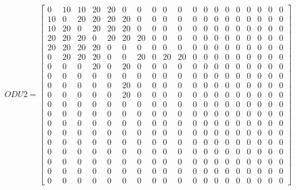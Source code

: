 \[
ODU2=
  \begin{bmatrix}
    0 & 10 & 10 & 20 & 20 & 0 & 0 & 0 & 0 & 0 & 0 & 0 & 0 & 0 & 0 & 0 & 0 & 0 & 0 \\
    10 & 0 & 20 & 20 & 20 & 20 & 0 & 0 & 0 & 0 & 0 & 0 & 0 & 0 & 0 & 0 & 0 & 0 & 0 \\
    10 & 20 & 0 & 20 & 20 & 20 & 0 & 0 & 0 & 0 & 0 & 0 & 0 & 0 & 0 & 0 & 0 & 0 & 0 \\
    20 & 20 & 20 & 0 & 20 & 20 & 20 & 0 & 0 & 0 & 0 & 0 & 0 & 0 & 0 & 0 & 0 & 0 & 0 \\
    20 & 20 & 20 & 20 & 0 & 0 & 0 & 0 & 0 & 0 & 0 & 0 & 0 & 0 & 0 & 0 & 0 & 0 & 0 \\
    0 & 20 & 20 & 20 & 0 & 0 & 20 & 0 & 20 & 20 & 0 & 0 & 0 & 0 & 0 & 0 & 0 & 0 & 0 \\
    0 & 0 & 0 & 20 & 0 & 20 & 0 & 0 & 0 & 0 & 0 & 0 & 0 & 0 & 0 & 0 & 0 & 0 & 0 \\
    0 & 0 & 0 & 0 & 0 & 0 & 0 & 0 & 0 & 0 & 0 & 0 & 0 & 0 & 0 & 0 & 0 & 0 & 0 \\
    0 & 0 & 0 & 0 & 0 & 20 & 0 & 0 & 0 & 0 & 0 & 0 & 0 & 0 & 0 & 0 & 0 & 0 & 0 \\
    0 & 0 & 0 & 0 & 0 & 20 & 0 & 0 & 0 & 0 & 0 & 0 & 0 & 0 & 0 & 0 & 0 & 0 & 0 \\
    0 & 0 & 0 & 0 & 0 & 0 & 0 & 0 & 0 & 0 & 0 & 0 & 0 & 0 & 0 & 0 & 0 & 0 & 0 \\
    0 & 0 & 0 & 0 & 0 & 0 & 0 & 0 & 0 & 0 & 0 & 0 & 0 & 0 & 0 & 0 & 0 & 0 & 0 \\
    0 & 0 & 0 & 0 & 0 & 0 & 0 & 0 & 0 & 0 & 0 & 0 & 0 & 0 & 0 & 0 & 0 & 0 & 0 \\
    0 & 0 & 0 & 0 & 0 & 0 & 0 & 0 & 0 & 0 & 0 & 0 & 0 & 0 & 0 & 0 & 0 & 0 & 0 \\
    0 & 0 & 0 & 0 & 0 & 0 & 0 & 0 & 0 & 0 & 0 & 0 & 0 & 0 & 0 & 0 & 0 & 0 & 0 \\
    0 & 0 & 0 & 0 & 0 & 0 & 0 & 0 & 0 & 0 & 0 & 0 & 0 & 0 & 0 & 0 & 0 & 0 & 0 \\
    0 & 0 & 0 & 0 & 0 & 0 & 0 & 0 & 0 & 0 & 0 & 0 & 0 & 0 & 0 & 0 & 0 & 0 & 0 \\
    0 & 0 & 0 & 0 & 0 & 0 & 0 & 0 & 0 & 0 & 0 & 0 & 0 & 0 & 0 & 0 & 0 & 0 & 0 \\
    0 & 0 & 0 & 0 & 0 & 0 & 0 & 0 & 0 & 0 & 0 & 0 & 0 & 0 & 0 & 0 & 0 & 0 & 0
  \end{bmatrix}
\]

\vspace{15pt}

